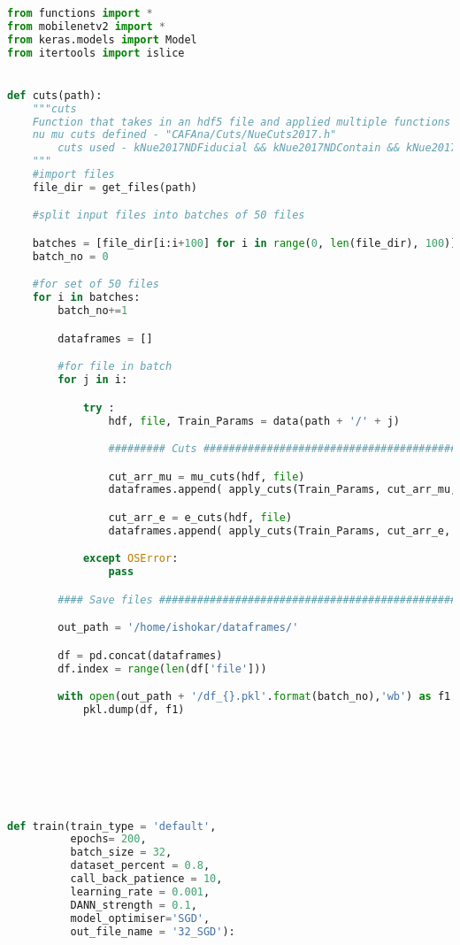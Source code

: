 \begin{lstlisting}[language=Python]
from functions import *
from mobilenetv2 import *
from keras.models import Model
from itertools import islice


def cuts(path):
    """cuts
    Function that takes in an hdf5 file and applied multiple functions to :
    nu mu cuts defined - "CAFAna/Cuts/NueCuts2017.h"
        cuts used - kNue2017NDFiducial && kNue2017NDContain && kNue2017NDFrontPlanes
    """
    #import files
    file_dir = get_files(path)

    #split input files into batches of 50 files

    batches = [file_dir[i:i+100] for i in range(0, len(file_dir), 100)]
    batch_no = 0

    #for set of 50 files
    for i in batches:
        batch_no+=1

        dataframes = []

        #for file in batch
        for j in i:

            try :
                hdf, file, Train_Params = data(path + '/' + j)

                ######### Cuts #############################################################

                cut_arr_mu = mu_cuts(hdf, file)
                dataframes.append( apply_cuts(Train_Params, cut_arr_mu, file) )

                cut_arr_e = e_cuts(hdf, file)
                dataframes.append( apply_cuts(Train_Params, cut_arr_e, file))

            except OSError:
                pass

        #### Save files #########################################################################

        out_path = '/home/ishokar/dataframes/'

        df = pd.concat(dataframes)
        df.index = range(len(df['file']))

        with open(out_path + '/df_{}.pkl'.format(batch_no),'wb') as f1:
            pkl.dump(df, f1)







def train(train_type = 'default',
          epochs= 200,
          batch_size = 32,
          dataset_percent = 0.8,
          call_back_patience = 10,
          learning_rate = 0.001,
          DANN_strength = 0.1, 
          model_optimiser='SGD',
          out_file_name = '32_SGD'):


\end{lstlisting}
